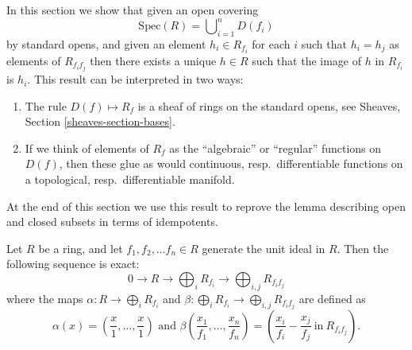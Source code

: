 \noindent
In this section we show that given an open covering
$$
\text{Spec}(R) = \bigcup\nolimits_{i = 1}^n D(f_i)
$$
by standard opens, and given an element $h_i \in R_{f_i}$
for each $i$ such that $h_i = h_j$ as elements of $R_{f_i f_j}$
then there exists a unique $h \in R$ such that the image of
$h$ in $R_{f_i}$ is $h_i$. This result can be interpreted
in two ways:
\begin{enumerate}
\item The rule $D(f) \mapsto R_f$ is a sheaf of rings
on the standard opens, see Sheaves, Section \ref{sheaves-section-bases}.
\item If we think of elements of $R_f$ as the ``algebraic''
or ``regular'' functions on $D(f)$, then these glue
as would continuous, resp.\ differentiable functions
on a topological, resp.\ differentiable manifold.
\end{enumerate}
At the end of this section we use this result to reprove the
lemma describing open and closed subsets in terms of
idempotents.

\begin{lemma}
\label{lemma-standard-covering}
Let $R$ be a ring, and let $f_1, f_2, \ldots f_n\in R$ generate
the unit ideal in $R$.
Then the following sequence is exact:
$$
0 \longrightarrow
R \longrightarrow
\bigoplus\nolimits_i R_{f_i} \longrightarrow
\bigoplus\nolimits_{i, j}R_{f_if_j}
$$
where the maps $\alpha : R \longrightarrow \bigoplus_i R_{f_i}$
and $\beta : \bigoplus_i R_{f_i} \longrightarrow \bigoplus_{i, j} R_{f_if_j}$
are defined as
$$
\alpha(x) = \left(\frac{x}{1}, \ldots, \frac{x}{1}\right)
\text{ and }
\beta\left(\frac{x_1}{f_1}, \ldots, \frac{x_n}{f_n}\right)
=
\left(\frac{x_i}{f_i}-\frac{x_j}{f_j}~\text{in}~R_{f_if_j}\right).
$$
\end{lemma}

